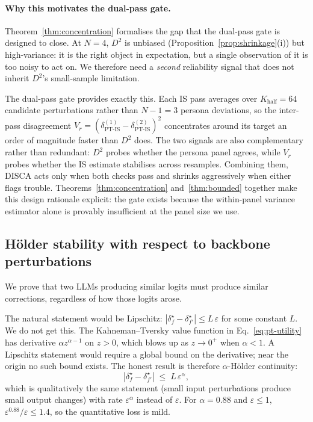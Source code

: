 \documentclass{article}
\begin{document}
\paragraph{Why this motivates the dual-pass gate.} 
Theorem~\ref{thm:concentration} formalises the gap that the dual-pass gate is designed to close. At $N{=}4$, $D^2$ is unbiased (Proposition~\ref{prop:shrinkage}(i)) but high-variance: it is the right object in expectation, but a single observation of it is too noisy to act on. We therefore need a \emph{second} reliability signal that does not inherit $D^2$'s small-sample limitation.

The dual-pass gate provides exactly this. Each IS pass averages over $K_{\text{half}} = 64$ candidate perturbations rather than $N{-}1 = 3$ persona deviations, so the inter-pass disagreement $V_r = (\delta_{\text{PT-IS}}^{(1)} - \delta_{\text{PT-IS}}^{(2)})^2$ concentrates around its target an order of magnitude faster than $D^2$ does. The two signals are also complementary rather than redundant: $D^2$ probes whether the persona panel agrees, while $V_r$ probes whether the IS estimate stabilises across resamples. Combining them, DISCA acts only when both checks pass and shrinks aggressively when either flags trouble. Theorems~\ref{thm:concentration} and~\ref{thm:bounded} together make this design rationale explicit: the gate exists because the within-panel variance estimator alone is provably insufficient at the panel size we use.


\subsection{H\"older stability with respect to backbone perturbations}
\label{app:theory:stability}

We prove that two LLMs producing similar logits must produce similar corrections, regardless of how those logits arose.

The natural statement would be Lipschitz: $|\delta^\star_f - \delta^\star_{f'}| \leq L\,\varepsilon$ for some constant $L$. We do not get this. The Kahneman--Tversky value function in Eq.~\ref{eq:pt-utility} has derivative $\alpha z^{\alpha-1}$ on $z > 0$, which blows up as $z \to 0^+$ when $\alpha < 1$. A Lipschitz statement would require a global bound on the derivative; near the origin no such bound exists. The honest result is therefore $\alpha$-H\"older continuity:
\begin{equation*}
|\delta^\star_f - \delta^\star_{f'}| \;\leq\; L\,\varepsilon^\alpha,
\end{equation*}
which is qualitatively the same statement (small input perturbations produce small output changes) with rate $\varepsilon^\alpha$ instead of $\varepsilon$. For $\alpha = 0.88$ and $\varepsilon \leq 1$, $\varepsilon^{0.88}/\varepsilon \leq 1.4$, so the quantitative loss is mild.
\end{document}
